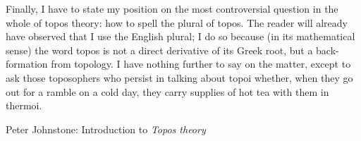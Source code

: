 \documentclass[12pt]{extreport}
\begin{document}
\noindent
Finally, I have to state my position on the most controversial question in the whole of topos theory: how to spell the plural of topos. The reader will already have observed that I use the English plural; I do so because (in its mathematical sense) the word topos is not a direct derivative of its Greek root, but a back-formation from topology. I have nothing further to say on the matter, except to ask those toposophers who persist in talking about topoi whether, when they go out for a ramble on a cold day, they carry supplies of hot tea with them in thermoi.

\bigskip \hfill Peter Johnstone: Introduction to {\it Topos theory}
\end{document}
